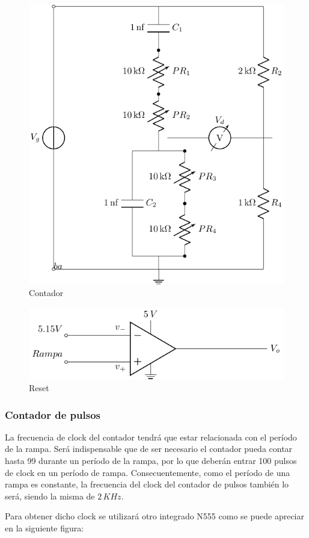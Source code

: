 \begin{figure}[H]
\centering
\includegraphics[scale=0.8]{Ejercicio8/Circuitos/Contador&Display.pdf}
\caption{Contador}
\label{fig:Contador&Display}
\end{figure}

\begin{figure}[H]
\centering
\includegraphics[scale=0.8]{Ejercicio8/Circuitos/Reset.pdf}
\caption{Reset}
\label{fig:Reset}
\end{figure}



\subsubsection{Contador de pulsos}

La frecuencia de clock del contador tendrá que estar relacionada con el período de la rampa. Será indispensable que de ser necesario el contador pueda contar hasta 99 durante un período de la rampa, por lo que deberán entrar 100 pulsos de clock en un período de rampa.  Consecuentemente, como el período de una rampa es constante, la frecuencia del clock del contador de pulsos también lo será, siendo la misma de $2\,KHz$. \par
Para obtener dicho clock se utilizará otro integrado N555 como se puede apreciar en la siguiente figura:

